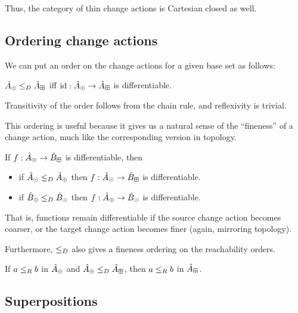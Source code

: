 Thus, the category of thin change actions is Cartesian closed as well.

\subsection{Ordering change actions}

We can put an order on the change actions for a given base set as follows:

\begin{defn}
  $\hat{A}_\oplus \leq_D \hat{A}_\boxplus$ iff $\textrm{id}: \hat{A}_\oplus \rightarrow \hat{A}_\boxplus$ is differentiable.
\end{defn}

Transitivity of the order follows from the chain rule, and reflexivity is trivial.

This ordering is useful because it gives us a natural sense of the ``fineness''
of a change action, much like the corresponding version in topology.

\begin{prop}
  If $f: \hat{A}_\oplus \rightarrow \hat{B}_\boxplus$ is differentiable, then
  \begin{itemize}
    \item if $\hat{A}_\odot \leq_D \hat{A}_\oplus$ then $f: \hat{A}_\odot \rightarrow
      \hat{B}_\boxplus$ is differentiable.
    \item if $\hat{B}_\oplus \leq_D \hat{B}_\odot$ then $f: \hat{A}_\oplus \rightarrow
      \hat{B}_\odot$ is differentiable.
  \end{itemize}
\end{prop}

That is, functions remain differentiable if the source change action becomes
coarser, or the target change action becomes finer (again, mirroring topology).

Furthermore, $\leq_D$ also gives a fineness ordering on the reachability orders.

\begin{prop}
  If $a \leq_R b$ in $\hat{A}_\oplus$ and $\hat{A}_\oplus \leq_D \hat{A}_\boxplus$, then $a \leq_R b$ in $\hat{A}_\boxplus$.
\end{prop}

\subsection{Superpositions}


